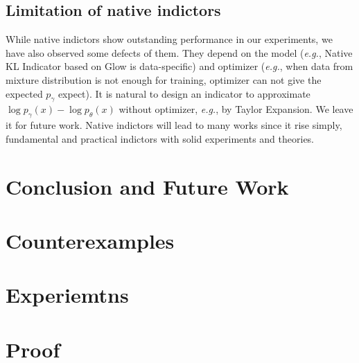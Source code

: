 \documentclass[letterpaper]{article} %
\newcommand{\EG}{\textit{e.g.}, }
\begin{document}
\subsection{Limitation of native indictors} 
While native indictors show outstanding performance in our experiments, we have also observed some defects of them. They depend on the model (\EG Native KL Indicator based on Glow is data-specific) and optimizer (\EG when data from mixture distribution is not enough for training, optimizer can not give the expected $p_\gamma$ expect). It is natural to design an indicator to approximate $\log p_\gamma(x) - \log p_\theta(x)$ without optimizer, \EG by Taylor Expansion. We leave it for future work. 
Native indictors will lead to many works since it rise simply, fundamental and practical indictors with solid experiments and theories. 

\section{Conclusion and Future Work}




\appendix
\section{Counterexamples}
\section{Experiemtns}
\section{Proof}
\end{document}
